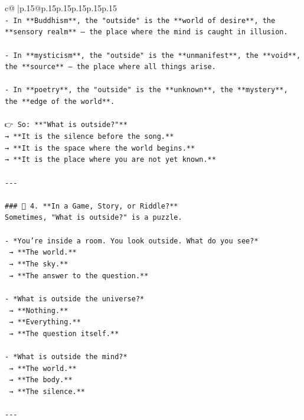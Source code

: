 \documentclass{article}
\begin{document}
{\begin{supertabular}{c@{$\;$}|p{.15\linewidth}@{}p{.15\linewidth}p{.15\linewidth}p{.15\linewidth}p{.15\linewidth}p{.15\linewidth}}
{{{\\ 
\texttt{{-} In **Buddhism**, the "outside" is the **world of desire**, the **sensory realm** — the place where the mind is caught in illusion.} \\
\\ 
\texttt{{-} In **mysticism**, the "outside" is the **unmanifest**, the **void**, the **source** — the place where all things arise.} \\
\\ 
\texttt{{-} In **poetry**, the "outside" is the **unknown**, the **mystery**, the **edge of the world**.} \\
\\ 
\texttt{👉 So: **"What is outside?"**  } \\
\texttt{→ **It is the silence before the song.**  } \\
\texttt{→ **It is the space where the world begins.**  } \\
\texttt{→ **It is the place where you are not yet known.**} \\
\\ 
\texttt{{-}{-}{-}} \\
\\ 
\texttt{\#\#\# 🔹 4. **In a Game, Story, or Riddle?**  } \\
\texttt{Sometimes, "What is outside?" is a puzzle.} \\
\\ 
\texttt{{-} *You’re inside a room. You look outside. What do you see?*  } \\
\texttt{  → **The world.**  } \\
\texttt{  → **The sky.**  } \\
\texttt{  → **The answer to the question.**} \\
\\ 
\texttt{{-} *What is outside the universe?*  } \\
\texttt{  → **Nothing.**  } \\
\texttt{  → **Everything.**  } \\
\texttt{  → **The question itself.**} \\
\\ 
\texttt{{-} *What is outside the mind?*  } \\
\texttt{  → **The world.**  } \\
\texttt{  → **The body.**  } \\
\texttt{  → **The silence.**} \\
\\ 
\texttt{{-}{-}{-}} \\
}}}
\end{supertabular}}
\end{document}
